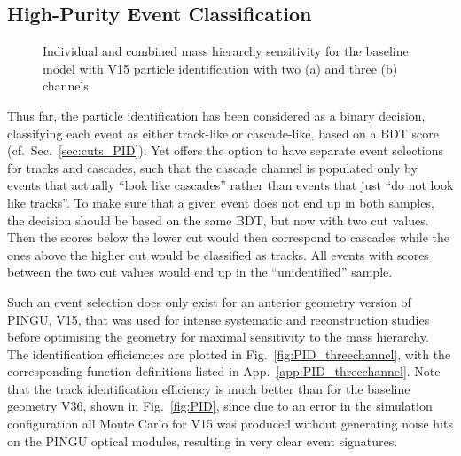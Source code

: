 \subsection{High-Purity Event Classification}
\label{sec:results_includeunkn}

\begin{figure}[thp]
 \centering
 \caption{Individual and combined mass hierarchy sensitivity for the
   baseline model with V15 particle identification with two (a) and three
   (b) channels.}
 \label{fig:sigma_vs_t_HQPID}
\end{figure}

\noindent
Thus far, the particle identification has been considered as a binary decision,
classifying each event as either track-like or cascade-like, based on a BDT 
score (cf.\ Sec.~\ref{sec:cuts_PID}). Yet \papa offers the option to have 
separate event selections for tracks and cascades, such that \eg the cascade 
channel is populated only by events that actually ``look like cascades'' rather 
than events that just ``do not look like tracks''. To make sure that a given 
event does not end up in both samples, the decision should be based on the same 
BDT, but now with two cut values. Then the scores below the lower cut would 
then \eg correspond to cascades while the ones above the higher cut would be 
classified as tracks. All events with scores between the two cut values would 
end up in the ``unidentified'' sample.

Such an event selection does only exist for an anterior geometry version of 
PINGU, V15, that was used for intense systematic and reconstruction studies 
before optimising the geometry for maximal sensitivity to the mass hierarchy. 
The identification efficiencies are plotted in Fig.~\ref{fig:PID_threechannel}, 
with the corresponding function definitions listed in 
App.~\ref{app:PID_threechannel}. Note that the track identification efficiency 
is much better than for the baseline geometry V36, shown in Fig.~\ref{fig:PID}, 
since due to an error in the simulation configuration all Monte Carlo for V15 
was produced without generating noise hits on the PINGU optical modules, 
resulting in very clear event signatures.

